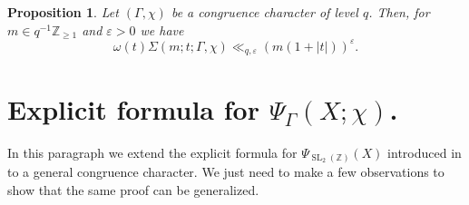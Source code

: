 \documentclass{article}
\newtheorem{prop}[thm]{Proposition}
\theoremstyle{named}
\newcommand{\Z}{\mathbb{Z}}
\DeclareMathOperator{\SL}{SL}
\begin{document}
\begin{prop}\label{prop:upperboundfouriercoefficentseisenstein}
Let $(\Gamma, \chi)$ be a congruence character of level $q$. Then, for $m \in q^{-1}\Z_{\geq 1}$ and $\varepsilon > 0$ we have 
\begin{equation*}
    \omega(t)\Sigma(m; t; \Gamma, \chi) \ll_{q, \varepsilon} (m(1 + |t|))^\varepsilon.
\end{equation*}
\end{prop}




\section{Explicit formula for $\Psi_\Gamma(X; \chi)$.}\label{sec:iwaniecslemma}
In this paragraph we extend the explicit formula for $\Psi_{\SL_2(\Z)}(X)$ introduced in \cite[Lemma 1]{Iwaniec1984} to a general congruence character. We just need to make a few observations to show that the same proof can be generalized.
\end{document}
